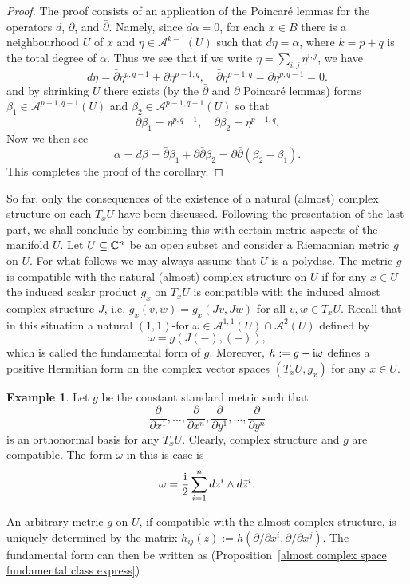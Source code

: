 \documentclass[11pt]{book}
\theoremstyle{definition}
\newtheorem{example}[theorem]{Example}
\begin{document}
\begin{proof}
The proof consists of an application of the Poincar\'e lemmas for the operators $d$, $\partial$, and $\bar{\partial}$. Namely, since $d\alpha=0$, for each $x\in B$ there is a neighbourhood $U$ of $x$ and $\eta\in\mathcal{A}^{k-1}(U)$ such that $d\eta=\alpha$, where $k=p+q$ is the total degree of $\alpha$. Thus we see that if we write $\eta=\sum_{i,j}\eta^{i,j}$, we have
\[d\eta=\bar{\partial}\eta^{p,q-1}+\partial\eta^{p-1,q},\quad \bar{\partial}\eta^{p-1,q}=\partial\eta^{p,q-1}=0.\]
and by shrinking $U$ there exists (by the $\bar{\partial}$ and $\partial$ Poincar\'e lemmas) forms $\beta_1\in\mathcal{A}^{p-1,q-1}(U)$ and $\beta_2\in\mathcal{A}^{p-1,q-1}(U)$ so that
\[\partial\beta_1=\eta^{p,q-1},\quad \bar{\partial}\beta_2=\eta^{p-1,q}.\]
Now we then see
\[\alpha=d\beta=\bar{\partial}\beta_1+\partial\bar{\partial}\beta_2=\partial\bar{\partial}(\beta_2-\beta_1).\]
This completes the proof of the corollary.
\end{proof}
So far, only the consequences of the existence of a natural (almost) complex structure on each $T_xU$ have been discussed. Following the presentation of the last part, we shall conclude by combining this with certain metric aspects of the manifold $U$. Let $U\subseteq\mathbb{C}^n$ be an open subset and consider a Riemannian metric $g$ on $U$. For what follows we may always assume that $U$ is a polydisc. The metric $g$ is compatible with the natural (almost) complex structure on $U$ if for any $x\in U$ the induced scalar product $g_x$ on $T_xU$ is compatible with the induced almost complex structure $J$, i.e. $g_x(v,w)=g_x(Jv,Jw)$ for all $v,w\in T_xU$. Recall that in this situation a natural $(1,1)$-for $\omega\in\mathcal{A}^{1,1}(U)\cap\mathcal{A}^2(U)$ defined by
\[\omega=g(J(-),(-)),\]
which is called the fundamental form of $g$. Moreover, $h:=g-\mathrm{i}\omega$ defines a positive Hermitian form on the complex vector spaces $(T_xU,g_x)$ for any $x\in U$.
\begin{example}
Let $g$ be the constant standard metric such that
\[\frac{\partial}{\partial x^1},\dots,\frac{\partial}{\partial x^n},\frac{\partial}{\partial y^1},\dots,\frac{\partial}{\partial y^n}\]
is an orthonormal basis for any $T_xU$. Clearly, complex structure and $g$ are compatible. The form $\omega$ in this is case is
\[\omega=\frac{\mathrm{i}}{2}\sum_{i=1}^{n}dz^i\wedge d\bar{z}^i.\]
\end{example}
An arbitrary metric $g$ on $U$, if compatible with the almost complex structure, is uniquely determined by the matrix $h_{ij}(z):=h(\partial/\partial x^i,\partial/\partial x^j)$. The fundamental form can then be written as (Proposition~\ref{almost complex space fundamental class express})
\end{document}
